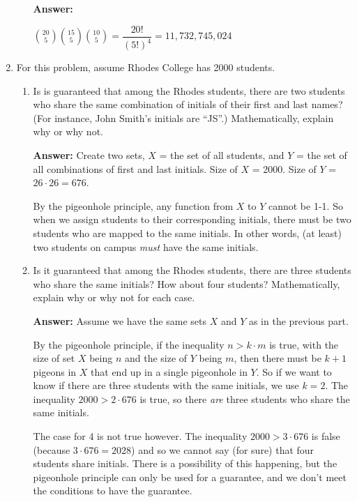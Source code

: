 \documentclass[11pt, letterpaper]{report}
\begin{document}
\begin{enumerate}
\begin{enumerate}
         \textbf{Answer:}
        
        $\displaystyle \binom{20}{5}\binom{15}{5}\binom{10}{5} = \dfrac{20!}{(5!)^4}=11,732,745,024$
        
        
        
\end{enumerate}


\item For this problem, assume Rhodes College has 2000 students.
\begin{enumerate}
	\item Is is guaranteed that among the Rhodes students, there are two students
	who share the same combination of initials of their first and last names?  (For instance,
	John Smith's initials are ``JS''.) Mathematically, explain why or why not.
	
	 \textbf{Answer:} Create two sets, $X$ = the set of all students, and $Y$ = the set of all combinations of
        first and last initials.  Size of $X$ = 2000.  Size of $Y$ = $26\cdot 26=676$.
        
        By the pigeonhole principle, any function from $X$ to $Y$ cannot be 1-1.  So when we assign
        students to their corresponding initials, there must be two students who are mapped to the
        same initials.  In other words, (at least) two students on campus \emph{must} have the same initials.
        

	
	
	
	\item Is it guaranteed that among the Rhodes students, there are three students
	who share the same initials?  How about four students?  Mathematically, explain why or why not for each
	case.
	
	
	\textbf{Answer:} Assume we have the same sets $X$ and $Y$ as in the previous part.
        
        By the pigeonhole principle, if the inequality $n > k\cdot m$ is true, with the size of set $X$
        being $n$ and the size of $Y$ being $m$, then there must be $k+1$
        pigeons in $X$ that end up in a single pigeonhole in $Y$.  So if we want to know if there are three
        students with the same initials, we use $k=2$.  The inequality $2000 > 2 \cdot 676$ is true, so 
        there \emph{are} three students who share the same initials.
        
        The case for 4 is not true however.  The inequality $2000 > 3\cdot 676$ is false (because $3\cdot 676=2028$) and so we cannot say (for sure) that four students share initials.  There is a possibility
        of this happening, but the pigeonhole principle can only be used for a guarantee, and we don't
        meet the conditions to have the guarantee.
        


\end{enumerate}
\end{enumerate}
\end{document}
